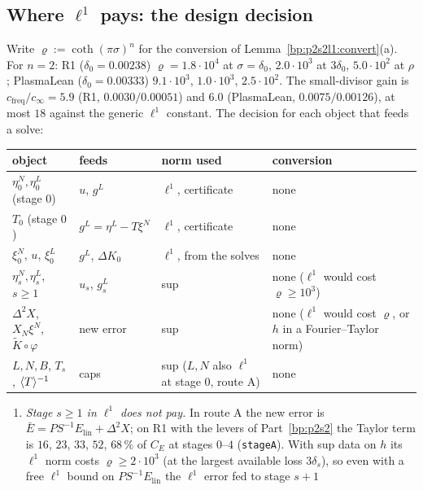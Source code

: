 \subsection{Where $\ell^1$ pays: the design decision}\label{bp:p2s2l1:sec-design}

\begin{remark}\label{bp:p2s2l1:design}
Write $\varrho:=\coth(\pi\sigma)^n$ for the conversion of Lemma~\ref{bp:p2s2l1:convert}(a). For $n=2$: R1 ($\delta_0=0.00238$) $\varrho=1.8\cdot10^4$
at $\sigma=\delta_0$, $2.0\cdot10^3$ at $3\delta_0$, $5.0\cdot10^2$ at $\rho$; PlasmaLean ($\delta_0=0.00333$) $9.1\cdot10^3$, $1.0\cdot10^3$, $2.5\cdot10^2$. The
small-divisor gain is $c_{\mathrm{freq}}/c_\infty=5.9$ (R1, $0.0030/0.00051$) and $6.0$ (PlasmaLean, $0.0075/0.00126$), at most $18$ against the
generic $\ell^1$ constant. The decision for each object that feeds a solve:
\begin{center}\small
\begin{tabular}{p{3.3cm}p{2.5cm}p{3.6cm}p{4.0cm}}
object & feeds & norm used & conversion\\\hline
$\eta^N_0,\eta^L_0$ (stage $0$) & $u$, $g^L$ & $\ell^1$, certificate & none\\
$T_0$ (stage $0$) & $g^L=\eta^L-T\xi^N$ & $\ell^1$, certificate & none\\
$\xi^N_0$, $u$, $\xi^L_0$ & $g^L$, $\Delta K_0$ & $\ell^1$, from the solves & none\\
$\eta^N_s,\eta^L_s$, $s\ge1$ & $u_s$, $g^L_s$ & sup & none ($\ell^1$ would cost $\varrho\ge10^3$)\\
$\Delta^2X$, $X_N\xi^N$, $\tilde K\circ\varphi$ & new error & sup & none ($\ell^1$ would cost $\varrho$, or $h$ in a Fourier--Taylor norm)\\
$L,N,B$, $T_s$, $\langle T\rangle^{-1}$ & caps & sup ($L,N$ also $\ell^1$ at stage $0$, route A) & none
\end{tabular}
\end{center}
\begin{enumerate}[label=(\roman*)]
\item \emph{Stage $s\ge1$ in $\ell^1$ does not pay.} In route A the new error is $\bar E=PS^{-1}E_{\mathrm{lin}}+\Delta^2X$; on R1 with the levers of
  Part~\ref{bp:p2s2} the Taylor term is $16$, $23$, $33$, $52$, $68\,\%$ of $C_E$ at stages $0$--$4$ (\texttt{stageA}). With sup data on $h$ its $\ell^1$ norm costs
  $\varrho\ge2\cdot10^3$ (at the largest available loss $3\delta_s$), so even with a free $\ell^1$ bound on $PS^{-1}E_{\mathrm{lin}}$ the $\ell^1$ error fed to stage $s+1$

\end{enumerate}
\end{remark}

